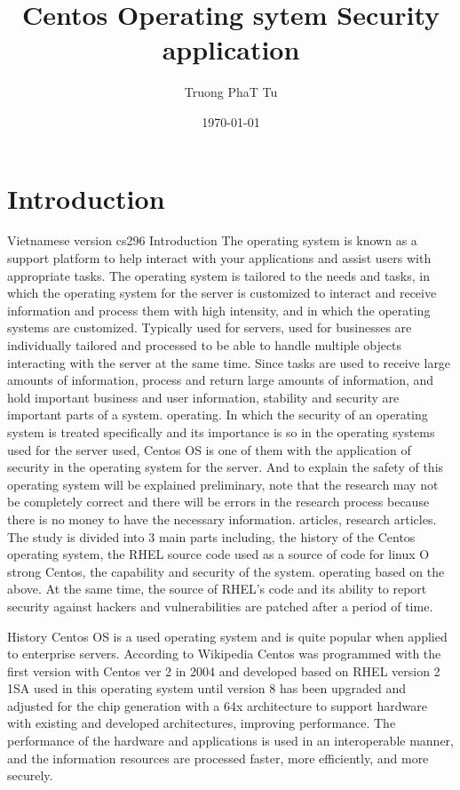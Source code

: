 \documentclass[10pt]{article}
\title{Centos Operating sytem Security application}
\author{Truong PhaT Tu}
\affil{
Luther College\\
Decorah, IA 52101\\
tuph01@luther.edu
}
\date{\today}
\begin{document}


\maketitle

\tableofcontents

\section{Introduction}

Vietnamese version cs296
Introduction
The operating system is known as a support platform to help interact with your applications and assist users with appropriate tasks. The operating system is tailored to the needs and tasks, in which the operating system for the server is customized to interact and receive information and process them with high intensity, and in which the operating systems are customized. Typically used for servers, used for businesses are individually tailored and processed to be able to handle multiple objects interacting with the server at the same time. Since tasks are used to receive large amounts of information, process and return large amounts of information, and hold important business and user information, stability and security are important parts of a system. operating. In which the security of an operating system is treated specifically and its importance is so in the operating systems used for the server used, Centos OS is one of them with the application of security in the operating system for the server. And to explain the safety of this operating system will be explained preliminary, note that the research may not be completely correct and there will be errors in the research process because there is no money to have the necessary information. articles, research articles. The study is divided into 3 main parts including, the history of the Centos operating system, the RHEL source code used as a source of code for linux O strong Centos, the capability and security of the system. operating based on the above. At the same time, the source of RHEL's code and its ability to report security against hackers and vulnerabilities are patched after a period of time.

History
Centos OS is a used operating system and is quite popular when applied to enterprise servers. According to Wikipedia Centos was programmed with the first version with Centos ver 2 in 2004 and developed based on RHEL version 2 1SA used in this operating system until version 8 has been upgraded and adjusted for the chip generation with a 64x architecture to support hardware with existing and developed architectures, improving performance. The performance of the hardware and applications is used in an interoperable manner, and the information resources are processed faster, more efficiently, and more securely.
\end{document}
